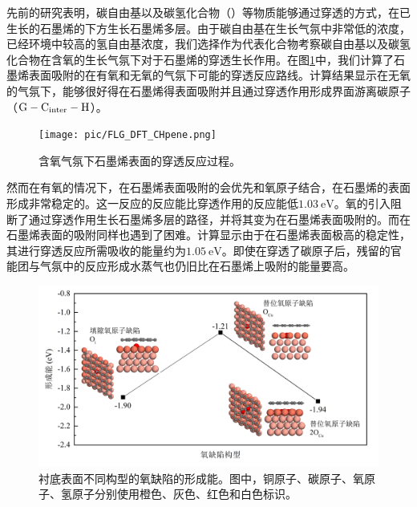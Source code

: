 先前的研究表明，碳自由基以及碳氢化合物（）等物质能够通过穿透的方式，在已生长的石墨烯的下方生长石墨烯多层。由于碳自由基在生长气氛中非常低的浓度，已经环境中较高的氢自由基浓度，我们选择作为代表化合物考察碳自由基以及碳氢化合物在含氧的生长气氛下对于石墨烯的穿透生长作用。在图\ref{fig:FLG_DFT_CHpene}中，我们计算了石墨烯表面吸附的在有氧和无氧的气氛下可能的穿透反应路线。计算结果显示在无氧的气氛下，能够很好得在石墨烯得表面吸附并且通过穿透作用形成界面游离碳原子（$\rm G-C_{inter}-H$）。

\begin{figure}[htb]
    \texttt{[image: pic/FLG\_DFT\_CHpene.png]}
    \caption{含氧气氛下石墨烯表面的穿透反应过程。}
    \label{fig:FLG_DFT_CHpene}
\end{figure}

然而在有氧的情况下，在石墨烯表面吸附的会优先和氧原子结合，在石墨烯的表面形成非常稳定的。这一反应的反应能比穿透作用的反应能低$\SI{1.03}{\electronvolt}$。氧的引入阻断了通过穿透作用生长石墨烯多层的路径，并将其变为在石墨烯表面吸附的。而在石墨烯表面的吸附同样也遇到了困难。计算显示由于在石墨烯表面极高的稳定性，其进行穿透反应所需吸收的能量约为$\SI{1.05}{\electronvolt}$。即使在穿透了碳原子后，残留的官能团与气氛中的反应形成水蒸气也仍旧比在石墨烯上吸附的能量要高。

\begin{figure}[htb]
    \includegraphics{pic/FLG_DFT_Odefect.png}
    \caption{衬底表面不同构型的氧缺陷的形成能。图中，铜原子、碳原子、氧原子、氢原子分别使用橙色、灰色、红色和白色标识。}
    \label{fig:FLG_DFT_Odefect}
\end{figure}


